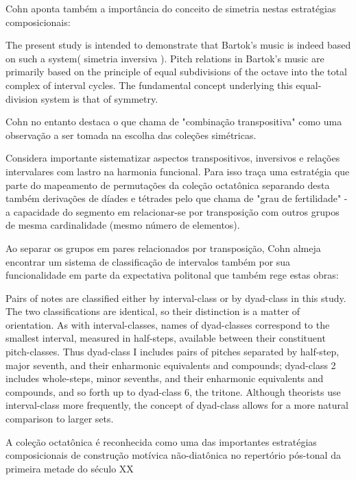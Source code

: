 \documentclass[
	12pt,				%
	openright,			%
	twoside,			%
	a4paper,			%
	english,			%
	french,				%
	spanish,			%
	brazil				%
	]{abntex2}
\begin{document}
Cohn aponta também a importância do conceito de simetria nestas estratégias composicionais:

\begin{citacao}
The present study is intended to demonstrate that
Bartok's music is indeed based on such a system( simetria inversiva ). Pitch relations
in Bartok's music are primarily based on the principle of equal subdivisions of the octave into the total complex of interval cycles. The fundamental concept underlying
this equal-division system is that of symmetry. \cite{cohn1988inversional}
\end{citacao}

Cohn no entanto destaca o que chama de "combinação transpositiva" como uma observação a ser tomada na escolha das coleções simétricas.

Considera importante sistematizar aspectos transpositivos, inversivos e relações intervalares com lastro na harmonia funcional. Para isso traça uma estratégia que parte do mapeamento de permutações da coleção octatônica separando desta também derivações de díades e tétrades pelo que chama de "grau de fertilidade"\cite[ p.268]{cohn1991bartok} - a capacidade do segmento em relacionar-se por transposição com outros grupos de mesma cardinalidade (mesmo número de elementos).

Ao separar os grupos em pares relacionados por transposição, Cohn almeja encontrar um sistema de classificação de intervalos também por sua funcionalidade em parte da expectativa politonal que também rege estas obras:

\begin{citacao}
Pairs of notes are classified either by interval-class or by dyad-class in this study.
The two classifications are identical, so their distinction is a matter of orientation. As
with interval-classes, names of dyad-classes correspond to the smallest interval, measured in half-steps, available between their constituent pitch-classes. Thus dyad-class I includes pairs of pitches separated by half-step, major seventh, and their enharmonic equivalents and compounds; dyad-class 2 includes whole-steps, minor sevenths, and their enharmonic equivalents and compounds, and so forth up to
dyad-class 6, the tritone. Although theorists use interval-class more frequently, the
concept of dyad-class allows for a more natural comparison to larger sets.
\cite[ p.265-266]{cohn1991bartok}
\end{citacao}

A coleção octatônica é reconhecida como uma das importantes estratégias composicionais de construção motívica não-diatônica no repertório pós-tonal da primeira metade do século XX \cite{berger1963problems,antokoletz1984music,lester1989analytic,forte1991debussy,straus2004,de2013simetria}
\end{document}
